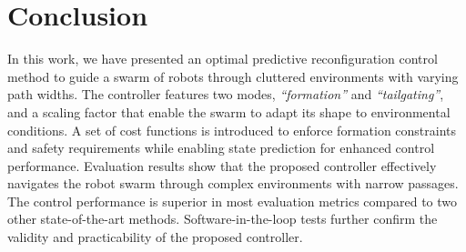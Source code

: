 \section{Conclusion}\label{sec:conclusion}
In this work, we have presented an optimal predictive reconfiguration control method to guide a swarm of robots through cluttered environments with varying path widths. The controller features two modes, \textit{``formation''} and \textit{``tailgating''}, and a scaling factor that enable the swarm to adapt its shape to environmental conditions. A set of cost functions is introduced to enforce formation constraints and safety requirements while enabling state prediction for enhanced control performance. Evaluation results show that the proposed controller effectively navigates the robot swarm through complex environments with narrow passages. The control performance is superior in most evaluation metrics compared to two other state-of-the-art methods. Software-in-the-loop tests further confirm the validity and practicability of the proposed controller.